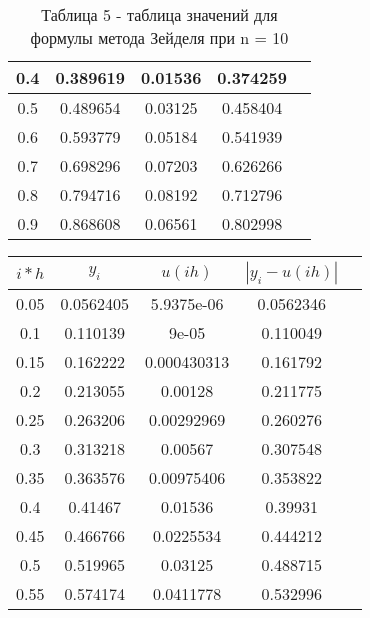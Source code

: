 \documentclass[a4paper,12pt]{article}
\begin{document}
{\begin{enumerate}[label = \arabic*.]
{\begin{table}[h]
\begin{tabular}{|c|c|c|c|c|}
            \hline
            0.4 &     0.389619 &      0.01536 &     0.374259\\
            \hline
            0.5 &     0.489654 &      0.03125 &     0.458404\\
            \hline
            0.6 &     0.593779 &      0.05184 &     0.541939\\
            \hline
            0.7 &     0.698296 &      0.07203 &     0.626266\\
            \hline
            0.8 &     0.794716 &      0.08192 &     0.712796\\
            \hline
            0.9 &     0.868608 &      0.06561 &     0.802998\\
            \hline
          \end{tabular}
          \caption*{\small{Таблица 5 - таблица значений для формулы метода Зейделя при n = 10}}
        \end{table}
        \begin{table}[h]
          \centering
          \begin{tabular}{|c|c|c|c|c|}
            \hline
            $i*h$ & $y_i$ & $u(ih)$ & $\left|y_i-u(ih)\right|$\\
            \hline
            0.05 &    0.0562405 &   5.9375e-06 &    0.0562346\\
            \hline
            0.1 &     0.110139 &        9e-05 &     0.110049\\
            \hline
            0.15 &     0.162222 &  0.000430313 &     0.161792\\
            \hline
            0.2 &     0.213055 &      0.00128 &     0.211775\\
            \hline
            0.25 &     0.263206 &   0.00292969 &     0.260276\\
            \hline
            0.3 &     0.313218 &      0.00567 &     0.307548\\
            \hline
            0.35 &     0.363576 &   0.00975406 &     0.353822\\
            \hline
            0.4 &      0.41467 &      0.01536 &      0.39931\\
            \hline
            0.45 &     0.466766 &    0.0225534 &     0.444212\\
            \hline
            0.5 &     0.519965 &      0.03125 &     0.488715\\
            \hline
            0.55 &     0.574174 &    0.0411778 &     0.532996\\

\end{tabular}
\end{table}}
\end{enumerate}}
\end{document}
